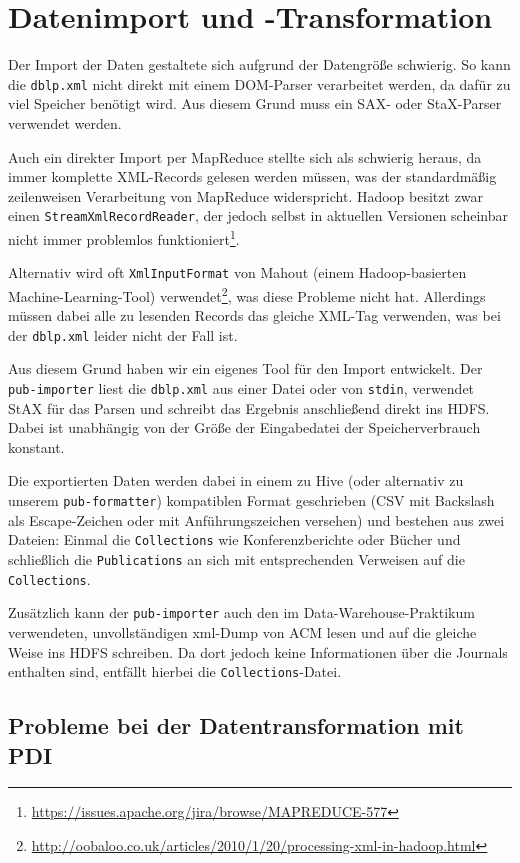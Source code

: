 \documentclass[a4paper,11pt,utf8]{scrartcl}
\begin{document}
\section{Datenimport und -Transformation}

Der Import der Daten gestaltete sich aufgrund der Datengröße schwierig. So kann die \texttt{dblp.xml} nicht direkt mit einem DOM-Parser verarbeitet werden, da dafür zu viel Speicher benötigt wird. Aus diesem Grund muss ein SAX- oder StaX-Parser verwendet werden.

Auch ein direkter Import per MapReduce stellte sich als schwierig heraus, da immer komplette XML-Records gelesen werden müssen, was der standardmäßig zeilenweisen Verarbeitung von MapReduce widerspricht. Hadoop besitzt zwar einen \texttt{StreamXmlRecordReader}, der jedoch selbst in aktuellen Versionen scheinbar nicht immer problemlos funktioniert\footnote{\url{https://issues.apache.org/jira/browse/MAPREDUCE-577}}.

Alternativ wird oft \texttt{XmlInputFormat} von Mahout (einem Hadoop-basierten Machine-Learning-Tool) verwendet\footnote{\url{http://oobaloo.co.uk/articles/2010/1/20/processing-xml-in-hadoop.html}}, was diese Probleme nicht hat. Allerdings müssen dabei alle zu lesenden Records das gleiche XML-Tag verwenden, was bei der \texttt{dblp.xml} leider nicht der Fall ist.

Aus diesem Grund haben wir ein eigenes Tool für den Import entwickelt. Der \texttt{pub-importer} liest die \texttt{dblp.xml} aus einer Datei oder von \texttt{stdin}, verwendet StAX für das Parsen und schreibt das Ergebnis anschließend direkt ins HDFS. Dabei ist unabhängig von der Größe der Eingabedatei der Speicherverbrauch konstant.

Die exportierten Daten werden dabei in einem zu Hive (oder alternativ zu unserem \texttt{pub-formatter}) kompatiblen Format geschrieben (CSV mit Backslash als Escape-Zeichen oder mit Anführungszeichen versehen) und bestehen aus zwei Dateien: Einmal die \texttt{Collections} wie Konferenzberichte oder Bücher und schließlich die \texttt{Publications} an sich mit entsprechenden Verweisen auf die \texttt{Collections}.

Zusätzlich kann der \texttt{pub-importer} auch den im Data-Warehouse-Praktikum verwendeten, unvollständigen xml-Dump von ACM lesen und auf die gleiche Weise ins HDFS schreiben. Da dort jedoch keine Informationen über die Journals enthalten sind, entfällt hierbei die \texttt{Collections}-Datei.

\subsection{Probleme bei der Datentransformation mit PDI}
\end{document}
